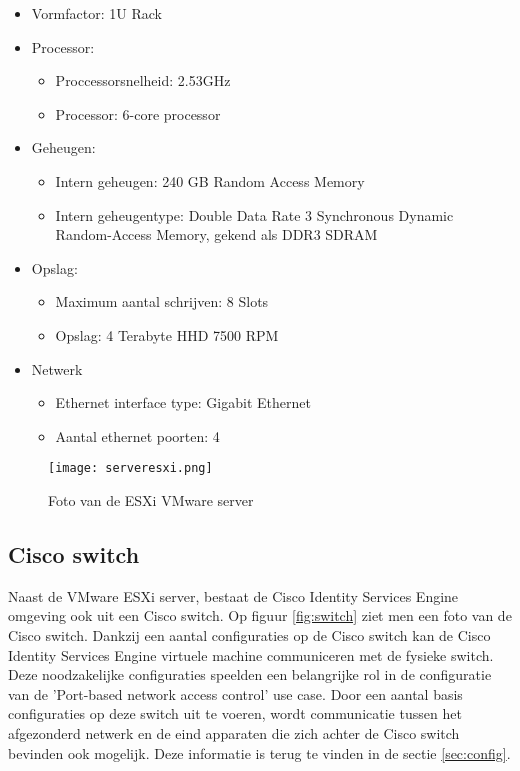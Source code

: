 \begin{itemize}
	\item Vormfactor: 1U Rack
	\item Processor:
	\begin{itemize}
		\item Proccessorsnelheid: 2.53GHz
		\item Processor: 6-core processor
	\end{itemize}
	\item Geheugen:
	\begin{itemize}
		\item Intern geheugen: 240 GB Random Access Memory
		\item Intern geheugentype: Double Data Rate 3 Synchronous Dynamic Random-Access Memory, gekend als DDR3 SDRAM
	\end{itemize}
	\item Opslag:
	\begin{itemize}
		\item Maximum aantal schrijven: 8 Slots
		\item Opslag: 4 Terabyte HHD 7500 RPM
	\end{itemize}
	\item Netwerk
	\begin{itemize}
		\item Ethernet interface type: Gigabit Ethernet
		\item Aantal ethernet poorten: 4 
	\end{itemize}
\end{itemize}

\begin{figure}[H]
	\centering
	\texttt{[image: serveresxi.png]}
	\caption{Foto van de ESXi VMware server}
	\label{fig:VmwareSer}
\end{figure}

\subsection{Cisco switch}
Naast de VMware ESXi server, bestaat de Cisco Identity Services Engine omgeving ook uit een Cisco switch. Op figuur \ref{fig:switch} ziet men een foto van de Cisco switch. Dankzij een aantal configuraties op de Cisco switch kan de Cisco Identity Services Engine virtuele machine communiceren met de fysieke switch. Deze noodzakelijke configuraties speelden een belangrijke rol in de configuratie van de 'Port-based network access control' use case. 
\newline
\newline
Door een aantal basis configuraties op deze switch uit te voeren, wordt communicatie tussen het afgezonderd netwerk en de eind apparaten die zich achter de Cisco switch bevinden ook mogelijk. Deze informatie is terug te vinden in de sectie \ref{sec:config}.


